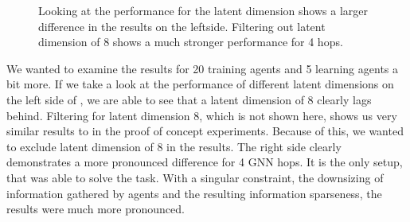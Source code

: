 \begin{figure}[htp]
    \centering
    \hspace{1cm}                       
    \caption{Looking at the performance for the latent dimension shows a larger difference in the results on the leftside. Filtering out latent dimension of 8 shows a much stronger performance for 4 hops.}
    \label{fig:ablation-ld-no-ld8}
\end{figure}

We wanted to examine the results for 20 training agents and 5 learning agents a bit more. If we take a look at the performance of different latent dimensions on the left side of , we are able to see that a latent dimension of 8 clearly lags behind. Filtering for latent dimension 8, which is not shown here, shows us very similar results to  in the proof of concept experiments. Because of this, we wanted to exclude latent dimension of 8 in the results. The right side clearly demonstrates a more pronounced difference for 4 GNN hops. It is the only setup, that was able to solve the task. With a singular constraint, the downsizing of information gathered by agents and the resulting information sparseness, the results were much more pronounced.


